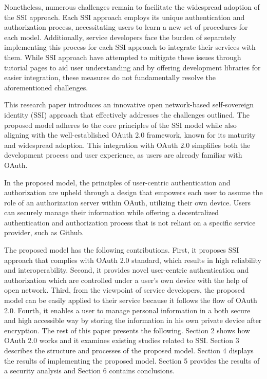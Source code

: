 \par
Nonetheless, numerous challenges remain to facilitate the widespread adoption of the SSI approach. Each SSI approach employs its unique authentication and authorization process, necessitating users to learn a new set of procedures for each model. Additionally, service developers face the burden of separately implementing this process for each SSI approach to integrate their services with them. While SSI approach have attempted to mitigate these issues through tutorial pages to aid user understanding and by offering development libraries for easier integration, these measures do not fundamentally resolve the aforementioned challenges.
\par
This research paper introduces an innovative open network-based self-sovereign identity (SSI) approach that effectively addresses the challenges outlined. The proposed model adheres to the core principles of the SSI model while also aligning with the well-established OAuth 2.0 framework, known for its maturity and widespread adoption. This integration with OAuth 2.0 simplifies both the development process and user experience, as users are already familiar with OAuth.
\par
In the proposed model, the principles of user-centric authentication and authorization are upheld through a design that empowers each user to assume the role of an authorization server within OAuth, utilizing their own device. Users can securely manage their information while offering a decentralized authentication and authorization process that is not reliant on a specific service provider, such as Github.
\par
The proposed model has the following contributions. First, it proposes SSI approach that complies with OAuth 2.0 standard, which results in high reliability and interoperability. Second, it provides novel user-centric authentication and authorization which are controlled under a user’s own device with the help of open network. Third, from the viewpoint of service developers, the proposed model can be easily applied to their service because it follows the flow of OAuth 2.0. Fourth, it enables a user to manage personal information in a both secure and high accessible way by storing the information in his own private device after encryption.
The rest of this paper presents the following. Section 2 shows how OAuth 2.0 works and it examines existing studies related to SSI. Section 3 describes the structure and processes of the proposed model. Section 4 displays the results of implementing the proposed model. Section 5 provides the results of a security analysis and Section 6 contains conclusions.


